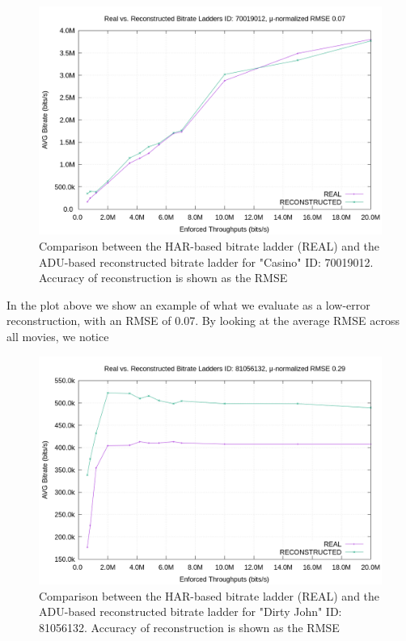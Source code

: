 \begin{figure}[!h]
  \centering
  \includegraphics[width=\columnwidth]{img/70019012.png}
  \caption{Comparison between the HAR-based bitrate ladder (REAL) and the ADU-based reconstructed bitrate ladder for "Casino" ID: 70019012. Accuracy of reconstruction is shown as the RMSE}
  \label{fig:bl_comparison_good}
\end{figure}

In the plot above we show an example of what we evaluate as a low-error reconstruction, with an RMSE of 0.07. By looking at the average RMSE across all movies, we notice 

\begin{figure}[!h]
  \centering
  \includegraphics[width=\columnwidth]{img/81056132.png}
  \caption{Comparison between the HAR-based bitrate ladder (REAL) and the ADU-based reconstructed bitrate ladder for "Dirty John" ID: 81056132. Accuracy of reconstruction is shown as the RMSE}
  \label{fig:bl_comparison_bad}
\end{figure}
